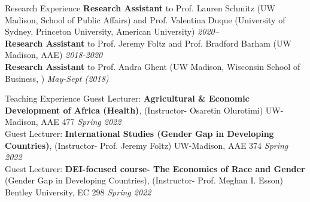 \documentclass{resume} %
\begin{document}
\begin{rSection}{Research Experience}
\textbf{Research Assistant} to Prof. Lauren Schmitz (UW Madison, School of Public Affairs) and Prof. Valentina Duque (University of Sydney, Princeton University, American University) \hfill \textit{2020--} \\
\textbf{Research Assistant} to Prof. Jeremy Foltz and Prof. Bradford Barham (UW Madison, AAE) \hfill \textit{2018-2020} \\
\textbf{Research Assistant} to Prof. Andra Ghent (UW Madison, Wisconsin School of Business, ) \hfill \textit{May-Sept (2018)}
\end{rSection}


\begin{rSection}{Teaching Experience}
Guest Lecturer: \textbf{Agricultural \& Economic Development of Africa (Health)}, (Instructor- Osaretin Olurotimi) UW-Madison, AAE 477
 \hfill \textit{Spring 2022} \\
Guest Lecturer: \textbf{International Studies (Gender Gap in Developing Countries)}, (Instructor- Prof. Jeremy Foltz) UW-Madison, AAE 374
 \hfill \textit{Spring 2022} \\
Guest Lecturer: \textbf{DEI-focused course- The Economics of Race and Gender} (Gender Gap in Developing Countries), (Instructor- Prof. Meghan I. Esson) Bentley University, EC 298
 \hfill \textit{Spring 2022}
\end{rSection}
\end{document}
